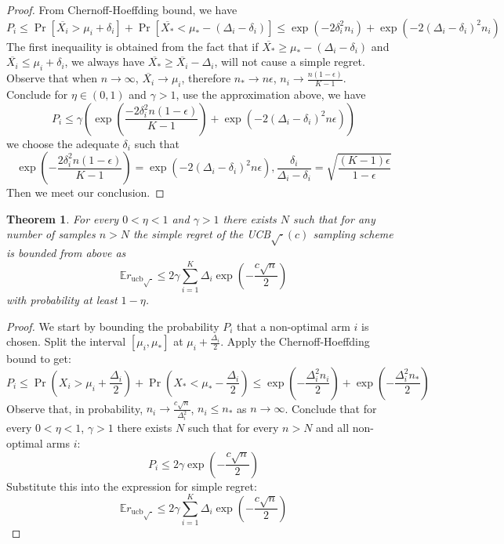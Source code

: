 \documentclass[11pt]{article}
\theoremstyle{definitionstyle}
\newtheorem{thm}{Theorem}
\begin{document}
\begin{proof}
From Chernoff-Hoeffding bound, we have
\[
    P_i\le\Pr[\overline{X_i}>\mu_i+\delta_i]+\Pr[\overline{X_*}<\mu_*-(\Delta_i-\delta_i)]\le\exp(-2\delta_i^2n_i)+\exp(-2(\Delta_i-\delta_i)^2n_i)
\]
The first inequaility is obtained from the fact that if $\overline{X_*}\ge\mu_*-(\Delta_i-\delta_i)$ and $\overline{X_i}\le\mu_i+\delta_i$, we always have $\overline{X_*}\ge\overline{X_i}-\Delta_i$, will not cause a simple regret.\\
Observe that when $n\to\infty$, $\overline{X_i}\to\mu_i$, therefore $n_*\to n\epsilon$, $n_i\to \frac{n(1-\epsilon)}{K-1}$.\\
Conclude for $\eta\in(0,1)$ and $\gamma>1$, use the approximation above, we have
\[
    P_i\le\gamma\left(\exp(\frac{-2\delta_i^2n(1-\epsilon)}{K-1})+\exp(-2(\Delta_i-\delta_i)^2n\epsilon)\right)
\]
we choose the adequate $\delta_i$ such that
\[
    \exp(-\frac{2\delta_i^2n(1-\epsilon)}{K-1})=\exp(-2(\Delta_i-\delta_i)^2n\epsilon),
    \frac{\delta_i}{\Delta_i-\delta_i}=\sqrt{\frac{(K-1)\epsilon}{1-\epsilon}}
\]
Then we meet our conclusion.
\end{proof}
\begin{thm}
For every $0 < \eta < 1$ and $\gamma > 1$ there exists $N$ such that for any number of samples $n > N$ the simple regret of the UCB$\sqrt{\cdot}(c)$ sampling scheme is bounded from above as
\[
\mathbb{E}r_{\text{ucb}\sqrt{\cdot}} \le 2\gamma \sum_{i=1}^K \Delta_i \exp\left( -\frac{c\sqrt{n}}{2} \right)
\]
with probability at least $1 - \eta$.
\end{thm}
\begin{proof}
We start by bounding the probability $P_i$ that a non-optimal arm $i$ is chosen. Split the interval $[\mu_i, \mu_*]$ at $\mu_i + \frac{\Delta_i}{2}$. Apply the Chernoff-Hoeffding bound to get:
\[
P_i \le \Pr\left( X_i > \mu_i + \frac{\Delta_i}{2} \right) + \Pr\left( X_* < \mu_* - \frac{\Delta_i}{2} \right) \le \exp\left( -\frac{\Delta_i^2 n_i}{2} \right) + \exp\left( -\frac{\Delta_i^2 n_*}{2} \right)
\]
Observe that, in probability, $n_i \to \frac{c\sqrt{n}}{\Delta_i^2}$, $n_i \le n_*$ as $n \to \infty$. Conclude that for every $0 < \eta < 1$, $\gamma > 1$ there exists $N$ such that for every $n > N$ and all non-optimal arms $i$:
\[
P_i \le 2\gamma \exp\left( -\frac{c\sqrt{n}}{2} \right)
\]
Substitute this into the expression for simple regret:
\[
\mathbb{E}r_{\text{ucb}\sqrt{\cdot}} \le 2\gamma \sum_{i=1}^K \Delta_i \exp\left( -\frac{c\sqrt{n}}{2} \right)
\]
\end{proof}
\end{document}
